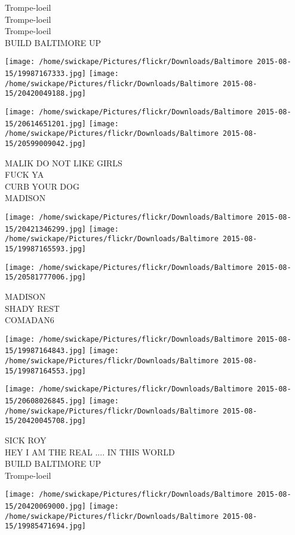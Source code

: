 \documentclass[10pt,letterpaper]{article}
\begin{document}
Trompe{-}loeil\\
Trompe{-}loeil\\
Trompe{-}loeil\\
BUILD BALTIMORE UP
\pagebreak

\texttt{[image: /home/swickape/Pictures/flickr/Downloads/Baltimore 2015-08-15/19987167333.jpg]}
\texttt{[image: /home/swickape/Pictures/flickr/Downloads/Baltimore 2015-08-15/20420049188.jpg]}

\texttt{[image: /home/swickape/Pictures/flickr/Downloads/Baltimore 2015-08-15/20614651201.jpg]}
\texttt{[image: /home/swickape/Pictures/flickr/Downloads/Baltimore 2015-08-15/20599009042.jpg]}

MALIK DO NOT LIKE GIRLS\\
FUCK YA\\
CURB YOUR DOG\\
MADISON
\pagebreak

\texttt{[image: /home/swickape/Pictures/flickr/Downloads/Baltimore 2015-08-15/20421346299.jpg]}
\texttt{[image: /home/swickape/Pictures/flickr/Downloads/Baltimore 2015-08-15/19987165593.jpg]}

\vspace{0.25in}
\texttt{[image: /home/swickape/Pictures/flickr/Downloads/Baltimore 2015-08-15/20581777006.jpg]}

MADISON\\
SHADY REST\\
COMADAN6
\pagebreak

\texttt{[image: /home/swickape/Pictures/flickr/Downloads/Baltimore 2015-08-15/19987164843.jpg]}
\texttt{[image: /home/swickape/Pictures/flickr/Downloads/Baltimore 2015-08-15/19987164553.jpg]}

\texttt{[image: /home/swickape/Pictures/flickr/Downloads/Baltimore 2015-08-15/20608026845.jpg]}
\texttt{[image: /home/swickape/Pictures/flickr/Downloads/Baltimore 2015-08-15/20420045708.jpg]}

SICK ROY\\
HEY I AM THE REAL .... IN THIS WORLD\\
BUILD BALTIMORE UP\\
Trompe{-}loeil
\pagebreak

\texttt{[image: /home/swickape/Pictures/flickr/Downloads/Baltimore 2015-08-15/20420069000.jpg]}
\texttt{[image: /home/swickape/Pictures/flickr/Downloads/Baltimore 2015-08-15/19985471694.jpg]}
\end{document}
